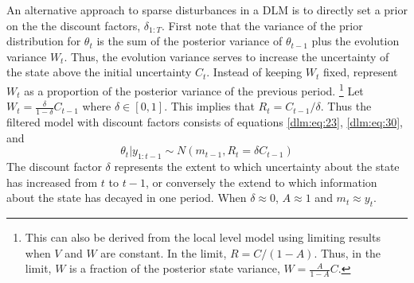 An alternative approach to sparse disturbances in a DLM is to directly set a prior on the the discount factors, $\delta_{1:T}$. 
First note that the variance of the prior distribution for $\theta_{t}$  is the sum of the posterior variance of $\theta_{t - 1}$ plus the evolution variance $W_{t}$.
Thus, the evolution variance serves to increase the uncertainty of the state above the initial uncertainty $C_{t}$.
Instead of keeping $W_{t}$ fixed, represent $W_{t}$ as a proportion of the posterior variance of the previous period.%
\footnote{
  This can also be derived from the local level model using limiting results when $V$ and $W$ are constant. 
  In the limit, $R = C / (1 - A)$.
  Thus, in the limit, $W$ is a fraction of the posterior state variance, $W = \frac{A}{1 - A} C$.
}
Let $W_{t} = \frac{\delta}{1 - \delta} C_{t - 1}$ where $\delta \in [0, 1]$. 
This implies that $R_{t} = C_{t - 1} / \delta$.
Thus the filtered model with discount factors consists of equations \eqref{dlm:eq:23}, \eqref{dlm:eq:30}, and
\begin{equation}
  \label{dlm:eq:10}
  \theta_{t} | y_{1:t-1} \sim N(m_{t-1}, R_{t} = \delta C_{t - 1})
\end{equation}
The discount factor $\delta$ represents the extent to which uncertainty about the state has increased from $t$ to $t - 1$, or conversely the extend to which information about the state has decayed in one period.
When $\delta \approx 0$, $A \approx 1$ and $m_{t} \approx y_{t}$.


